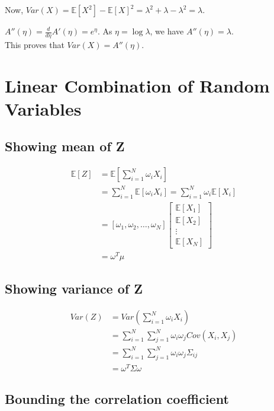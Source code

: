 \documentclass[a4paper]{article}
\begin{document}
\begin{enumerate}[label=(\alph*)]
    Now, $Var(X) = \mathbb{E}[X^2] - \mathbb{E}[X]^2 = \lambda^2 + \lambda - \lambda^2 = \lambda$.
    
    $A''(\eta) = \frac{d}{d\eta} A'(\eta) = e^\eta$. As $\eta = \log \lambda$, we have $A''(\eta) = \lambda$.\\

    This proves that $Var(X) = A''(\eta)$.    
\end{enumerate}

\newpage

\section{Linear Combination of Random Variables}
\subsection{Showing mean of Z}

\begin{align*}
    \mathbb{E}[Z] &= \mathbb{E}[\sum_{i=1}^{N} \omega_i X_i] \\
    &= \sum_{i=1}^{N} \mathbb{E}[\omega_i X_i] = \sum_{i=1}^{N} \omega_i \mathbb{E}[X_i] \\
    &= [\omega_1, \omega_2, \dots, \omega_N] \begin{bmatrix}
        \mathbb{E}[X_1] \\
        \mathbb{E}[X_2] \\
        \vdots \\
        \mathbb{E}[X_N]
      \end{bmatrix}\\
    &= \omega^T \mu
\end{align*}

\subsection{Showing variance of Z}

\begin{align*}
              Var(Z) &= Var(\sum_{i=1}^{N} \omega_i X_i) \\
    &= \sum_{i=1}^{N} \sum_{j=1}^{N} \omega_i \omega_j Cov(X_i, X_j) \\
    &= \sum_{i=1}^{N} \sum_{j=1}^{N} \omega_i \omega_j \Sigma_{ij} \\
    &= \omega^T \Sigma \omega
\end{align*}

\subsection{Bounding the correlation coefficient}
\end{document}
